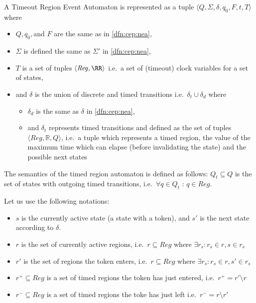 			
\begin{dfn}
\label{dfn:cep:trea}
A Timeout Region Event Automaton is represented as a tuple $\langle Q,\Sigma,\delta,q_0, F, t, T \rangle$ where
\begin{itemize}
	\item $Q, q_0,$and $F$ are the same as in \cref{dfn:cep:nea},
	\item $\Sigma$ is defined the same as $\Sigma'$ in \cref{dfn:cep:nea}, 
	
	\item $T$ is a set of tuples $\langle \mathit{Reg}, \RR \rangle$ i.e.~a set of (timeout) clock variables for a set of states,
	\item and $\delta$ is the union of discrete and timed transitions i.e.~$\delta_t \cup \delta_d$ where
	\begin{itemize}
		\item $\delta_d$ is the same as $\delta$ in \cref{dfn:cep:nea},
		\item and $\delta_t$ represents timed transitions and defined as the set of tuples $\langle \mathit{Reg} , \mathbb{R} , Q \rangle$, i.e.~a tuple which represents a timed region, the value of the maximum time which can elapse (before invalidating the state) and the possible next states
	\end{itemize}
\end{itemize}
\end{dfn}
			
			
The semantics of the timed region automaton is defined as follows: $Q_t \subseteq Q$ is the set of states with outgoing timed transitions, i.e.~$\forall q \in Q_t$ : $ q \in \mathit{Reg} $. 
			
			
Let us use the following notations: 
			
\begin{itemize}
	\item $s$ is the currently active state (a state with a token), and $s'$ is the next state according to $\delta$.		
	\item $r$ is the set of currently active regions, i.e.~$r \subseteq \mathit{Reg}$ where $\exists r_s : r_s \in r, s \in r_s $ 
	\item $r'$ is the set of regions the token enters, i.e.~$r \subseteq \mathit{Reg}$ where $\exists r_s :  r_s \in r, s' \in r_s $ 
	\item $r^+ \subseteq \mathit{Reg}$ is a set of timed regions the token has just entered, i.e.~$r^+ = r' \setminus r$ 
	\item $r^- \subseteq \mathit{Reg}$ is a set of timed regions the toke has just left i.e.~$r^- = r \setminus r'$
\end{itemize}
			
